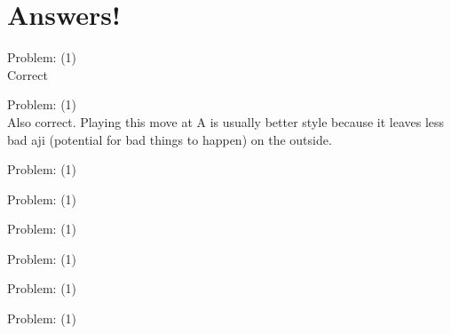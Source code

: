 \documentclass[11pt]{article}
\begin{document}
\part{Answers!}
\begin{minipage}[t]{0.5\textwidth}
  {\centering
  
Problem: (1)\\
Correct\\
  }
\end{minipage}
\begin{minipage}[t]{0.5\textwidth}
  {\centering
  
Problem: (1)\\
Also correct. Playing this move at A is usually better style because it leaves less bad aji (potential for bad things to happen) on the outside.\\
  }
\end{minipage}
\begin{minipage}[t]{0.5\textwidth}
  {\centering
  
Problem: (1)\\
  }
\end{minipage}
\begin{minipage}[t]{0.5\textwidth}
  {\centering
  
Problem: (1)\\
  }
\end{minipage}
\begin{minipage}[t]{0.5\textwidth}
  {\centering
  
Problem: (1)\\
  }
\end{minipage}
\begin{minipage}[t]{0.5\textwidth}
  {\centering
  
Problem: (1)\\
  }
\end{minipage}
\begin{minipage}[t]{0.5\textwidth}
  {\centering
  
Problem: (1)\\
  }
\end{minipage}
\begin{minipage}[t]{0.5\textwidth}
  {\centering
  
Problem: (1)\\
  }
\end{minipage}
\end{document}
